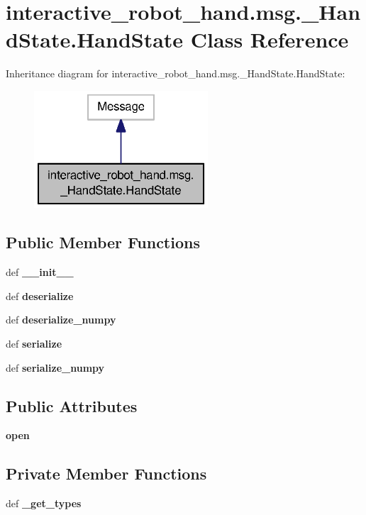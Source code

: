 \section{interactive\-\_\-robot\-\_\-hand.\-msg.\-\_\-\-Hand\-State.\-Hand\-State Class Reference}
\label{classinteractive__robot__hand_1_1msg_1_1__HandState_1_1HandState}


Inheritance diagram for interactive\-\_\-robot\-\_\-hand.\-msg.\-\_\-\-Hand\-State.\-Hand\-State\-:\nopagebreak
\begin{figure}[H]
\begin{center}
\leavevmode
\includegraphics[width=184pt]{classinteractive__robot__hand_1_1msg_1_1__HandState_1_1HandState__inherit__graph}
\end{center}
\end{figure}
\subsection*{Public Member Functions}
\begin{DoxyCompactItemize}
\item 
def {\bf \-\_\-\-\_\-init\-\_\-\-\_\-}
\item 
def {\bf deserialize}
\item 
def {\bf deserialize\-\_\-numpy}
\item 
def {\bf serialize}
\item 
def {\bf serialize\-\_\-numpy}
\end{DoxyCompactItemize}
\subsection*{Public Attributes}
\begin{DoxyCompactItemize}
\item 
{\bf open}
\end{DoxyCompactItemize}
\subsection*{Private Member Functions}
\begin{DoxyCompactItemize}
\item 
def {\bf \-\_\-get\-\_\-types}
\end{DoxyCompactItemize}
